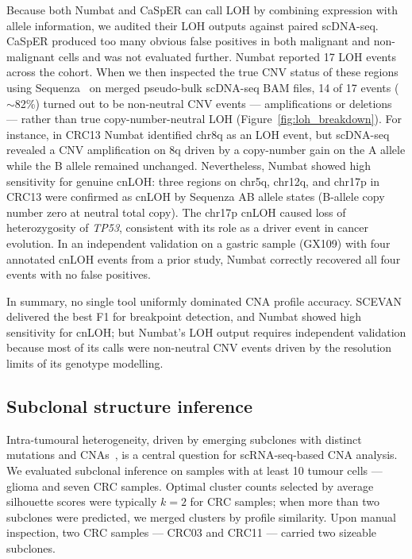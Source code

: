 \documentclass[11pt]{article}
\begin{document}
Because both Numbat and CaSpER can call LOH by combining expression with
allele information, we audited their LOH outputs against paired scDNA-seq.
CaSpER produced too many obvious false positives in both malignant and
non-malignant cells and was not evaluated further. Numbat reported 17 LOH
events across the cohort. When we then inspected the true CNV status of
these regions using Sequenza~\cite{favero2015sequenza} on merged pseudo-bulk
scDNA-seq BAM files, 14 of 17 events ($\sim$82\%) turned out to be
non-neutral CNV events --- amplifications or deletions --- rather than true
copy-number-neutral LOH (Figure~\ref{fig:loh_breakdown}). For instance, in
CRC13 Numbat identified chr8q as an LOH event, but scDNA-seq revealed a
CNV amplification on 8q driven by a copy-number gain on the A allele while
the B allele remained unchanged. Nevertheless, Numbat showed high
sensitivity for genuine cnLOH: three regions on chr5q, chr12q, and chr17p in
CRC13 were confirmed as cnLOH by Sequenza AB allele states (B-allele copy
number zero at neutral total copy). The chr17p cnLOH caused loss of
heterozygosity of \emph{TP53}, consistent with its role as a driver event in
cancer evolution. In an independent validation on a gastric sample (GX109)
with four annotated cnLOH events from a prior study, Numbat correctly
recovered all four events with no false positives.

In summary, no single tool uniformly dominated CNA profile accuracy. SCEVAN
delivered the best F1 for breakpoint detection, and Numbat showed high
sensitivity for cnLOH; but Numbat's LOH output requires independent
validation because most of its calls were non-neutral CNV events driven by
the resolution limits of its genotype modelling.

\subsection{Subclonal structure inference}

Intra-tumoural heterogeneity, driven by emerging subclones with distinct
mutations and CNAs~\cite{mcgranahan2017clonal}, is a central question for
scRNA-seq-based CNA analysis. We evaluated subclonal inference on samples
with at least 10 tumour cells --- glioma and seven CRC samples. Optimal
cluster counts selected by average silhouette scores were typically $k = 2$
for CRC samples; when more than two subclones were predicted, we merged
clusters by profile similarity. Upon manual inspection, two CRC samples ---
CRC03 and CRC11 --- carried two sizeable subclones.
\end{document}
